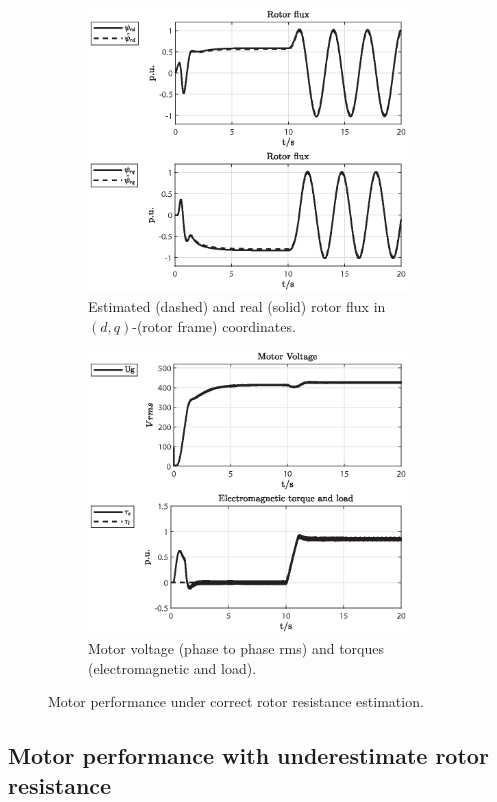 \documentclass[11pt,a4paper,oneside]{book}
\numberwithin{equation}{section}
\theoremstyle{it}
\theoremstyle{definition}
\begin{document}
\begin{figure}[H]
	\centering
	\begin{subfigure}{0.5\textwidth}
	\centering
	\includegraphics[width = 240pt, keepaspectratio]{figures/equal/rotor_flux_est_2.eps}
	\captionsetup{width=0.65\textwidth, font=footnotesize}	
	\caption{Estimated (dashed) and real (solid) rotor flux in $(d,q)$-(rotor frame) coordinates.}
	\label{fig_sim_res_3}
	\end{subfigure}%
	\begin{subfigure}{0.5\textwidth}
	\centering
	\includegraphics[width = 240pt, keepaspectratio]{figures/equal/motor_voltage.eps}
	\captionsetup{width=0.65\textwidth, font=footnotesize}	
	\caption{Motor voltage (phase to phase rms) and torques (electromagnetic and load).}
	\label{fig_sim_res_4}
	\end{subfigure}		
	\captionsetup{width=0.5\textwidth, font=small}	
	\caption{Motor performance under correct rotor resistance estimation.}
	\label{}
\end{figure}

\subsection{Motor performance with underestimate rotor resistance}
\end{document}
